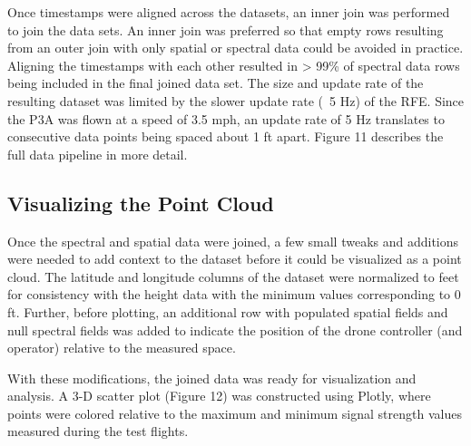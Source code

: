 \documentclass[pageno]{jpaper}
\begin{document}
Once timestamps were aligned across the datasets, an inner join was performed to join the data sets. An inner join was preferred so that empty rows resulting from an outer join with only spatial or spectral data could be avoided in practice. Aligning the timestamps with each other resulted in > 99\% of spectral data rows being included in the final joined data set. The size and update rate of the resulting dataset was limited by the slower update rate (~5 Hz) of the RFE. Since the P3A was flown at a speed of 3.5 mph, an update rate of 5 Hz translates to consecutive data points being spaced about 1 ft apart. Figure 11 describes the full data pipeline in more detail.

\subsection{Visualizing the Point Cloud}
Once the spectral and spatial data were joined, a few small tweaks and additions were needed to add context to the dataset before it could be visualized as a point cloud. The latitude and longitude columns of the dataset were normalized to feet for consistency with the height data with the minimum values corresponding to 0 ft. Further, before plotting, an additional row with populated spatial fields and null spectral fields was added to indicate the position of the drone controller (and operator) relative to the measured space. 

With these modifications, the joined data was ready for visualization and analysis. A 3-D scatter plot (Figure 12) was constructed using Plotly, where points were colored relative to the maximum and minimum signal strength values measured during the test flights. 
\end{document}
